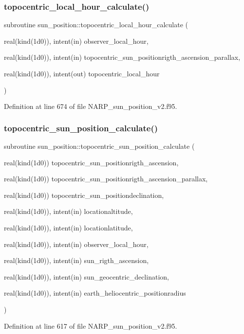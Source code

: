 \subsubsection{\texorpdfstring{topocentric\+\_\+local\+\_\+hour\+\_\+calculate()}{topocentric\_local\_hour\_calculate()}}
{\footnotesize\ttfamily subroutine sun\+\_\+position\+::topocentric\+\_\+local\+\_\+hour\+\_\+calculate (\begin{DoxyParamCaption}\item[{real(kind(1d0)), intent(in)}]{observer\+\_\+local\+\_\+hour,  }\item[{real(kind(1d0)), intent(in)}]{topocentric\+\_\+sun\+\_\+positionrigth\+\_\+ascension\+\_\+parallax,  }\item[{real(kind(1d0)), intent(out)}]{topocentric\+\_\+local\+\_\+hour }\end{DoxyParamCaption})}



Definition at line 674 of file N\+A\+R\+P\+\_\+sun\+\_\+position\+\_\+v2.\+f95.

\mbox{\label{_n_a_r_p__sun__position__v2_8f95_ace8944aaa83c0cdac9ffc5bf8569f2fe}} 
\subsubsection{\texorpdfstring{topocentric\+\_\+sun\+\_\+position\+\_\+calculate()}{topocentric\_sun\_position\_calculate()}}
{\footnotesize\ttfamily subroutine sun\+\_\+position\+::topocentric\+\_\+sun\+\_\+position\+\_\+calculate (\begin{DoxyParamCaption}\item[{real(kind(1d0))}]{topocentric\+\_\+sun\+\_\+positionrigth\+\_\+ascension,  }\item[{real(kind(1d0))}]{topocentric\+\_\+sun\+\_\+positionrigth\+\_\+ascension\+\_\+parallax,  }\item[{real(kind(1d0))}]{topocentric\+\_\+sun\+\_\+positiondeclination,  }\item[{real(kind(1d0)), intent(in)}]{locationaltitude,  }\item[{real(kind(1d0)), intent(in)}]{locationlatitude,  }\item[{real(kind(1d0)), intent(in)}]{observer\+\_\+local\+\_\+hour,  }\item[{real(kind(1d0)), intent(in)}]{sun\+\_\+rigth\+\_\+ascension,  }\item[{real(kind(1d0)), intent(in)}]{sun\+\_\+geocentric\+\_\+declination,  }\item[{real(kind(1d0)), intent(in)}]{earth\+\_\+heliocentric\+\_\+positionradius }\end{DoxyParamCaption})}



Definition at line 617 of file N\+A\+R\+P\+\_\+sun\+\_\+position\+\_\+v2.\+f95.

